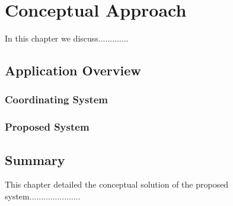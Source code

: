 \chapter{Conceptual Approach}
\label{cha:conceptanddesign}


In this chapter we discuss.............

\section{Application Overview}


\subsection{Coordinating System}


\subsection{Proposed System}


\section{Summary}

This chapter detailed the conceptual solution of the proposed system......................